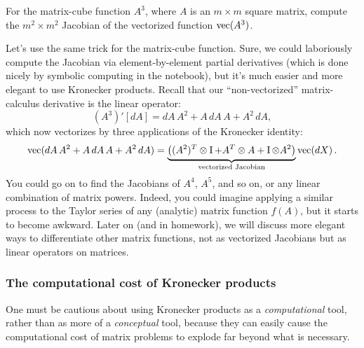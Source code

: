 \begin{example}For the matrix-cube function $A^{3}$, where $A$
is an $m\times m$ square matrix, compute the $m^{2}\times m^{2}$
Jacobian of the vectorized function $\operatorname{vec}(A^{3})$.\end{example}
Let's use the same trick for the matrix-cube function. Sure, we could
laboriously compute the Jacobian via element-by-element partial derivatives
(which is done nicely by symbolic computing in the notebook), but
it's much easier and more elegant to use Kronecker products. Recall
that our ``non-vectorized'' matrix-calculus derivative is the linear
operator: 
\[
(A^{3})'[dA]=dA\,A^{2}+A\,dA\,A+A^{2}\,dA,
\]
which now vectorizes by three applications of the Kronecker
identity:
\[
\operatorname{vec}(dA\,A^{2}+A\,dA\,A+A^{2}\,dA)=\underbrace{\left((A^{2})^{T}\otimes\operatorname{I}+A^{T}\otimes A+\operatorname{I}\otimes A^{2}\right)}_{\text{vectorized Jacobian}}\operatorname{vec}(d X)\,.
\]
You could go on to find the Jacobians of $A^{4}$, $A^{5}$, and so
on, or any linear combination of matrix powers. Indeed, you could
imagine applying a similar process to the Taylor series of any (analytic)
matrix function $f(A)$, but it starts to become awkward. Later on
(and in homework), we will discuss more elegant ways to differentiate
other matrix functions, not as vectorized Jacobians but as linear
operators on matrices.

\subsubsection{The computational cost of Kronecker products}

One must be cautious about using Kronecker products as a \emph{computational}
tool, rather than as more of a \emph{conceptual} tool, because they
can easily cause the computational cost of matrix problems to explode
far beyond what is necessary.

